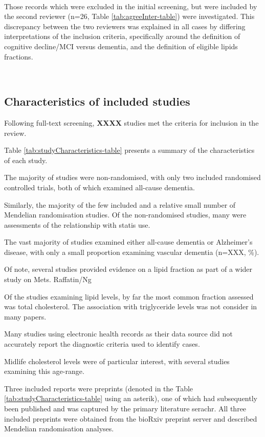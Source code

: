 \documentclass[a4paper, twoside]{templates/ociamthesis}
\begin{document}
~

Those records which were excluded in the initial screening, but were included by the second reviewer (n=26, Table \ref{tab:agreeInter-table}) were investigated. This discrepancy between the two reviewers was explained in all cases by differing interpretations of the inclusion criteria, specifically around the definition of cognitive decline/MCI versus dementia, and the definition of eligible lipids fractions.

~

\hypertarget{characteristics-of-included-studies}{%
\subsection{Characteristics of included studies}\label{characteristics-of-included-studies}}

Following full-text screening, \textbf{XXXX} studies met the criteria for inclusion in the review.

Table \ref{tab:studyCharacteristics-table} presents a summary of the characteristics of each study.

The majority of studies were non-randomised, with only two included randomised controlled trials, both of which examined all-cause dementia.

Similarly, the majority of the few included and a relative small number of Mendelian randomisation studies. Of the non-randomised studies, many were assessments of the relationship with statis use.

The vast majority of studies examined either all-cause dementia or Alzheimer's disease, with only a small proportion examining vascular dementia (n=XXX, \%).

Of note, several studies provided evidence on a lipid fraction as part of a wider study on Mets. Raffatin/Ng

Of the studies examining lipid levels, by far the most common fraction assessed was total cholesterol. The association with triglyceride levels was not consider in many papers.

Many studies using electronic health records as their data source did not accurately report the diagnostic criteria used to identify cases.

Midlife cholesterol levels were of particular interest, with several studies examining this age-range.

Three included reports were preprints (denoted in the Table \ref{tab:studyCharacteristics-table} using an asterik), one of which had subsequently been published and was captured by the primary literature serachr. All three included preprints were obtained from the bioRxiv preprint server and described Mendelian randomisation analyses.
\end{document}
